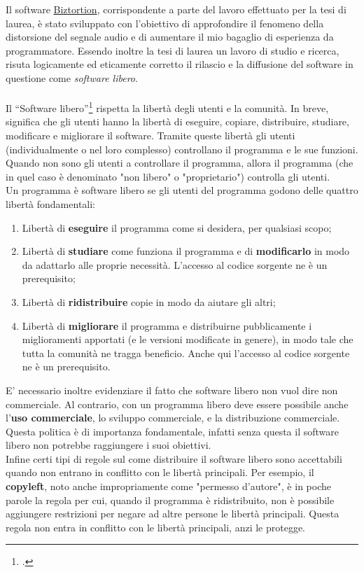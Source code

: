 Il software \hyperref[cap:biztortion]{Biztortion}, corrispondente a parte del lavoro effettuato per la tesi di laurea, è stato sviluppato con l'obiettivo di approfondire il fenomeno della distorsione del segnale audio e di aumentare il mio bagaglio di esperienza da programmatore. Essendo inoltre la tesi di laurea un lavoro di studio e ricerca, risuta logicamente ed eticamente corretto il rilascio e la diffusione del software in questione come \textit{software libero}. \\ \\
Il “Software libero”\footcite{site:software-libero} rispetta la libertà degli utenti e la comunità. In breve, significa che gli utenti hanno la libertà di eseguire, copiare, distribuire, studiare, modificare e migliorare il software. Tramite queste libertà gli utenti (individualmente o nel loro complesso) controllano il programma e le sue funzioni. Quando non sono gli utenti a controllare il programma, allora il programma (che in quel caso è denominato "non libero" o "proprietario") controlla gli utenti. \\
Un programma è software libero se gli utenti del programma godono delle quattro libertà fondamentali:
\begin{enumerate}
    \item Libertà di \textbf{eseguire} il programma come si desidera, per qualsiasi scopo;
    \item Libertà di \textbf{studiare} come funziona il programma e di \textbf{modificarlo} in modo da adattarlo alle proprie necessità. L'accesso al codice sorgente ne è un prerequisito;
    \item Libertà di \textbf{ridistribuire} copie in modo da aiutare gli altri;
    \item Libertà di \textbf{migliorare} il programma e distribuirne pubblicamente i miglioramenti apportati (e le versioni modificate in genere), in modo tale che tutta la comunità ne tragga beneficio. Anche qui l'accesso al codice sorgente ne è un prerequisito.
\end{enumerate}
E' necessario inoltre evidenziare il fatto che software libero non vuol dire non commerciale. Al contrario, con un programma libero deve essere possibile anche l'\textbf{uso commerciale}, lo sviluppo commerciale, e la distribuzione commerciale. Questa politica è di importanza fondamentale, infatti senza questa il software libero non potrebbe raggiungere i suoi obiettivi. \\
Infine certi tipi di regole sul come distribuire il software libero sono accettabili quando non entrano in conflitto con le libertà principali. Per esempio, il \textbf{copyleft}, noto anche impropriamente come "permesso d'autore", è in poche parole la regola per cui, quando il programma è ridistribuito, non è possibile aggiungere restrizioni per negare ad altre persone le libertà principali. Questa regola non entra in conflitto con le libertà principali, anzi le protegge.

